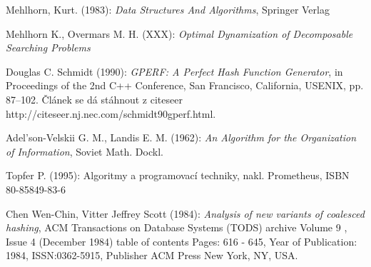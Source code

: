 \documentclass[a4paper]{report}
\theoremstyle{definition}
\begin{document}
\begin{thebibliography}{X}
Mehlhorn, Kurt. (1983): \emph{Data Structures And Algorithms}, 
Springer Verlag

Mehlhorn K., Overmars M. H. (XXX):
\emph{Optimal Dynamization of Decomposable Searching Problems}

Douglas C. Schmidt (1990): 
\emph{GPERF: A Perfect Hash Function Generator},
in Proceedings of the 2nd C++ Conference, 
San Francisco, California, USENIX, pp. 87--102.
Článek se dá stáhnout z 
\htmladdnormallink
{citeseer}
{http://citeseer.nj.nec.com/schmidt90gperf.html}.

Adel'son-Velskii G. M., Landis E. M. (1962): \emph{An Algorithm for the
Organization of Information}, Soviet Math. Dockl.

Topfer P. (1995): Algoritmy a programovací techniky, nakl. Prometheus,
ISBN 80-85849-83-6

Chen Wen-Chin, Vitter Jeffrey Scott (1984): \emph{Analysis of new variants
of coalesced hashing}, ACM Transactions on Database Systems (TODS) archive
Volume 9 ,  Issue 4  (December 1984) table of contents
Pages: 616 - 645, Year of Publication: 1984, ISSN:0362-5915, Publisher	
ACM Press New York, NY, USA.

\end{thebibliography}
\end{document}
